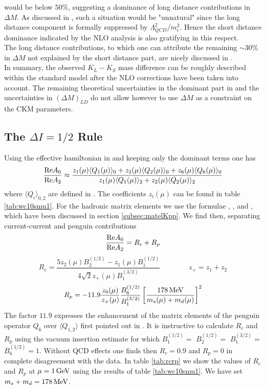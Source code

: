 would be below $50\%$, suggesting a dominance of long distance
contributions in $\Delta M$. As discussed in \cite{herrlichnierste:93},
such a situation would be "unnatural" since the long distance component
is formally suppressed by $\Lambda^2_{QCD}/m^2_c$. Hence the short
distance dominance indicated by the NLO analysis is also gratifying in
this respect.
\\
The long distance contributions, to which one can attribute the 
remaining $\sim 30\%$ in $\Delta M$ not explained by the short distance
part, are nicely discussed in \cite{bijnensetal:91}.
\\
In summary, the observed $K_L-K_S$ mass difference can be roughly
described within the standard model after the NLO corrections
have been taken into account. The remaining theoretical uncertainties
in the dominant part in  and the uncertainties in
$(\Delta M)_{LD}$ do not allow however to use $\Delta M$ as a 
constraint on the CKM parameters.

\subsection{The $\Delta I=1/2$ Rule}
            \label{sec:mki12:i12}
Using the effective hamiltonian in  and 
keeping only the dominant terms one has
\begin{equation}\label{rea0a2}
\frac{{\rm Re}A_0}{{\rm Re}A_2}\approx
\frac{z_1(\mu)\langle Q_1(\mu)\rangle_0+
      z_2(\mu)\langle Q_2(\mu)\rangle_0+z_6(\mu)\langle Q_6(\mu)\rangle_0} 
{z_1(\mu)\langle Q_1(\mu)\rangle_2+z_2(\mu)\langle Q_2(\mu)\rangle_2}
\end{equation}
where $\langle Q_i\rangle_{0,2}$ are defined in .  The
coefficients $z_i(\mu)$ can be found in table \ref{tab:wc10smu1}.  For
the hadronic matrix elements we use the formulae ,
,  and , which have been
discussed in section \ref{subsec:matelKpp}.  We find then, separating
current-current and penguin contributions
\begin{equation}\label{rcrp}
\frac{{\rm Re}A_0}{{\rm Re}A_2}=R_c+R_p
\end{equation}
\begin{equation}\label{rczb}
R_c=\frac{5z_2(\mu) B^{(1/2)}_2-z_1(\mu) B^{(1/2)}_1}{4\sqrt{2}z_+(\mu)
  B^{(3/2)}_1} \qquad\qquad   z_+=z_1+z_2
\end{equation}
\begin{equation}\label{rpzb}
R_p=-11.9\frac{z_6(\mu)}{z_+(\mu)}\frac{B^{(1/2)}_6}{B^{(3/2)}_1}
\left[\frac{178\, {\rm MeV}}{m_s(\mu)+m_d(\mu)}\right]^2
\end{equation}
The factor $11.9$ expresses the enhancement of the matrix elements of
the penguin operator $Q_6$ over $\langle Q_{1,2}\rangle$ first pointed
out in \cite{vainshtein:77}. It is instructive to calculate $R_c$ and
$R_p$ using the vacuum insertion estimate for which $B^{(1/2)}_1=$
$B^{(1/2)}_2=$ $B^{(3/2)}_1=$ $B^{(1/2)}_6=1$.  Without QCD effects one
finds then $R_c=0.9$ and $R_p=0$ in complete disagreement with the
data. In table \ref{tab:rcrp} we show the values of $R_c$ and $R_p$ at
$\mu=1\, {\rm GeV}$ using the results of table \ref{tab:wc10smu1}. We have set
$m_s+m_d=178\, {\rm MeV}$.

